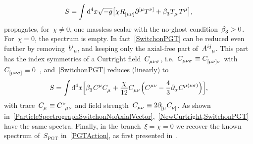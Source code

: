 \documentclass[aps,prd,reprint,preprintnumbers,showpacs,floatfix,nofootinbib,superscript address]{revtex4-2}
\begin{document}
\begin{equation}\label{SwitchonPGT}
	S=\int\mathrm{d}^4x\sqrt{-g}\big[\chi\MAGF{_{[\mu\nu]}}\PD{^{[\mu}}\MAGT{^{\nu]}}+\Bet{3}\MAGT{_{\mu}}\MAGT{^{\mu}}\big],	
\end{equation}
propagates, for~$\chi\neq 0$, one massless scalar with the no-ghost condition~$\Bet{3}>0$. For~$\chi=0$, the spectrum is empty. In fact~\cref{SwitchonPGT} can be reduced even further by removing~$\FieldB{^i_\mu}$, and keeping only the axial-free part of~$\FieldA{^{ij}_\mu}$. This part has the index symmetries of a Curtright field~$\Curtright{_{\mu\nu\sigma}}$, i.e.~$\Curtright{_{\mu\nu\sigma}}\equiv\Curtright{_{[\mu\nu]\sigma}}$ with~$\Curtright{_{[\mu\nu\sigma]}}\equiv 0$~\cite{Curtright:1980yk}, and~\cref{SwitchonPGT} reduces (linearly) to
\begin{equation}\label{NewCurtright}
	S=\int\mathrm{d}^4x\Big[
	\Bet{3}\Curtright{^\mu}\Curtright{_{\mu}}
	+\frac{\chi}{12}\Curtright{_{\mu\nu}}
	\Big(
			\Curtright{^{\mu\nu}}
			-\frac{4}{3}\PD{_\sigma}\Curtright{^{\mu(\nu\sigma)}}
	\Big)
	\Big],
\end{equation}
with trace~$\Curtright{_\mu}\equiv\Curtright{^\nu_{\mu\nu}}$ and field strength~$\Curtright{_{\mu\nu}}\equiv2\PD{_{[\mu}}\Curtright{_{\nu]}}$. As shown in~\cref{ParticleSpectrographSwitchonNoAxialVector},~\cref{NewCurtright,SwitchonPGT} have the same spectra. Finally, in the branch~$\xi=\chi=0$ we recover the known spectrum of~$S_{\text{PGT}}$ in~\cref{PGTAction}, as first presented in~\cite{Hayashi:1980qp}.
\end{document}
